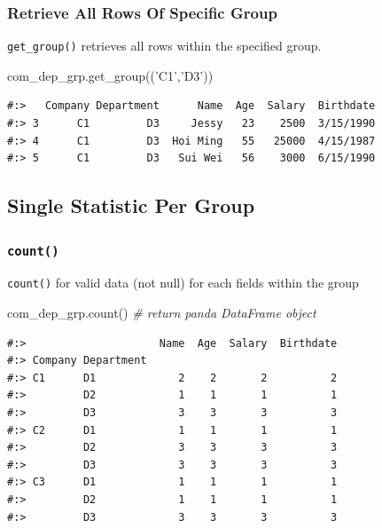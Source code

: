 \documentclass[
]{book}
\newenvironment{Shaded}{\begin{snugshade}}{\end{snugshade}}
\newcommand{\CommentTok}[1]{\textcolor[rgb]{0.37,0.37,0.37}{\textit{#1}}}
\newcommand{\NormalTok}[1]{#1}
\newcommand{\StringTok}[1]{\textcolor[rgb]{0.5,0.5,0.5}{#1}}
\begin{document}
\hypertarget{retrieve-all-rows-of-specific-group}{%
\subsubsection{Retrieve All Rows Of Specific Group}\label{retrieve-all-rows-of-specific-group}}

\texttt{get\_group()} retrieves all rows within the specified group.

\begin{Shaded}
\begin{Highlighting}[]
\NormalTok{com_dep_grp.get_group((}\StringTok{'C1'}\NormalTok{,}\StringTok{'D3'}\NormalTok{))}
\end{Highlighting}
\end{Shaded}

\begin{verbatim}
#:>   Company Department      Name  Age  Salary  Birthdate
#:> 3      C1         D3     Jessy   23    2500  3/15/1990
#:> 4      C1         D3  Hoi Ming   55   25000  4/15/1987
#:> 5      C1         D3   Sui Wei   56    3000  6/15/1990
\end{verbatim}

\hypertarget{single-statistic-per-group}{%
\subsection{Single Statistic Per Group}\label{single-statistic-per-group}}

\hypertarget{count}{%
\subsubsection{\texorpdfstring{\texttt{count()}}{count()}}\label{count}}

\texttt{count()} for valid data (not null) for each fields within the group

\begin{Shaded}
\begin{Highlighting}[]
\NormalTok{com_dep_grp.count()  }\CommentTok{# return panda DataFrame object}
\end{Highlighting}
\end{Shaded}

\begin{verbatim}
#:>                     Name  Age  Salary  Birthdate
#:> Company Department                              
#:> C1      D1             2    2       2          2
#:>         D2             1    1       1          1
#:>         D3             3    3       3          3
#:> C2      D1             1    1       1          1
#:>         D2             3    3       3          3
#:>         D3             3    3       3          3
#:> C3      D1             1    1       1          1
#:>         D2             1    1       1          1
#:>         D3             3    3       3          3
\end{verbatim}
\end{document}
